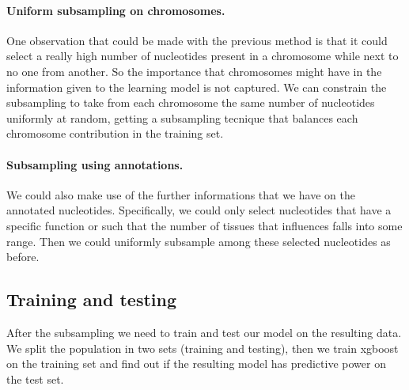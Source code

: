 \paragraph{Uniform subsampling on chromosomes.}
One observation that could be made with the previous method is that it could select a really high number of nucleotides present in a chromosome while next to no one from another. 
So the importance that chromosomes might have in the information given to the learning model is not captured. 
We can constrain the subsampling to take from each chromosome the same number of nucleotides uniformly at random, getting a subsampling tecnique that balances each chromosome contribution in the training set.

\paragraph{Subsampling using annotations.}
We could also make use of the further informations that we have on the annotated nucleotides.
Specifically, we could only select nucleotides that have a specific function or such that the number of tissues that influences falls into some range.
Then we could uniformly subsample among these selected nucleotides as before.


\subsection{Training and testing}

After the subsampling we need to train and test our model on the resulting data. 
We split the population in two sets (training and testing), then we train xgboost on the training set and find out if the resulting model has predictive power on the test set.